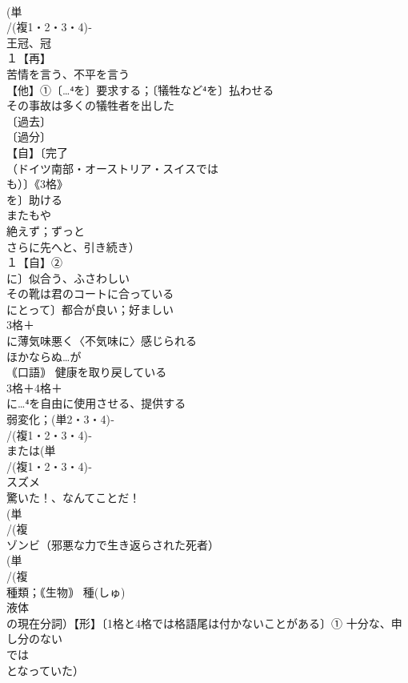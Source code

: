 \documentclass[8pt]{extreport}
\begin{document}
\begin{CJK}{UTF8}{min}
\\	(単
\\	/(複1・2・3・4)‐
\\	王冠、冠 
\\	１【再】
\\	苦情を言う、不平を言う 
\\	【他】①〔…⁴を〕要求する；〔犠牲など⁴を〕払わせる 
\\	その事故は多くの犠牲者を出した
\\	〔過去〕
\\	〔過分〕
\\	【自】〔完了
\\	（ドイツ南部・オーストリア・スイスでは
\\	も）〕《3格》
\\	を〕助ける 
\\	またもや
\\	絶えず；ずっと 
\\	さらに先へと、引き続き）
\\	１【自】②
\\	に〕似合う、ふさわしい 
\\	その靴は君のコートに合っている 
\\	にとって〕都合が良い；好ましい
\\	3格＋
\\	に薄気味悪く〈不気味に〉感じられる
\\	ほかならぬ…が
\\	｟口語｠ 健康を取り戻している
\\	3格＋4格＋
\\	に…⁴を自由に使用させる、提供する
\\	弱変化；(単2・3・4)‐
\\	/(複1・2・3・4)‐
\\	または(単
\\	/(複1・2・3・4)‐
\\	スズメ 
\\	驚いた！、なんてことだ！
\\	(単
\\	/(複
\\	ゾンビ（邪悪な力で生き返らされた死者）
\\	(単
\\	/(複
\\	種類；｟生物｠ 種(しゅ) 
\\	液体 
\\	の現在分詞）【形】〔1格と4格では格語尾は付かないことがある〕① 十分な、申し分のない 
\\	では
\\	となっていた）

\end{CJK}
\end{document}
